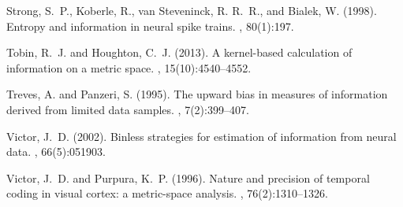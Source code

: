 \documentclass[12pt]{article}
\begin{document}
\begin{thebibliography}{}
Strong, S.~P., Koberle, R., van Steveninck, R. R.~R., and Bialek, W. (1998).
\newblock Entropy and information in neural spike trains.
, 80(1):197.

Tobin, R.~J. and Houghton, C.~J. (2013).
\newblock A kernel-based calculation of information on a metric space.
, 15(10):4540--4552.

Treves, A. and Panzeri, S. (1995).
\newblock The upward bias in measures of information derived from limited data
  samples.
, 7(2):399--407.

Victor, J.~D. (2002).
\newblock Binless strategies for estimation of information from neural data.
, 66(5):051903.

Victor, J.~D. and Purpura, K.~P. (1996).
\newblock Nature and precision of temporal coding in visual cortex: a
  metric-space analysis.
, 76(2):1310--1326.

\end{thebibliography}
\end{document}
